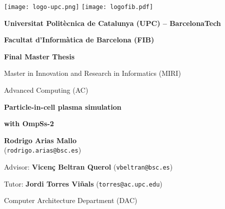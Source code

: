 
\thispagestyle{empty}

\begin{center}


\texttt{[image: logo-upc.png]}
\hspace{70mm}
\texttt{[image: logofib.pdf]}

\vspace{25mm}

{\bf\large Universitat Polit\`ecnica de Catalunya (UPC) -- BarcelonaTech}
\par\vspace{1mm}
{\bf\large Facultat d'Inform\`atica de Barcelona (FIB)}
\par\vspace{1mm}
{\bf\large Final Master Thesis}

\par\vspace{1em}
{\large Master in Innovation and Research in Informatics (MIRI)}
\par\vspace{0.8mm}
{\large Advanced Computing (AC)}
\par\vspace{15mm}

{\bf\LARGE Particle-in-cell plasma simulation}\\
\par\vspace{3mm}
{\bf\LARGE with OmpSs-2}

\par\vspace{2cm}
{\bf\large Rodrigo Arias Mallo}\\
(\texttt{rodrigo.arias@bsc.es})

\vspace{1.5cm}

{\large Advisor: }%
{\bf\large Vicen\c{c} Beltran Querol} (\texttt{vbeltran@bsc.es})\\
\par\vspace{2mm}
{\large Tutor: }%
{\bf\large Jordi Torres Viñals} (\texttt{torres@ac.upc.edu}) \\
\par\vspace{2mm}
{\large Computer Architecture Department (DAC)}
\par\vspace{4mm}


\end{center}
